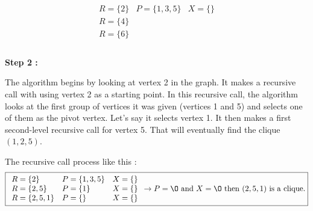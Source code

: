     $$ \boxed{
        \begin{array}{lll}
            R = \{2\} & P = \{1,3,5\} & X =\{\}\\
            R = \{4\} \\
            R = \{6\} \\
        \end{array}
    }$$
    \\
    \hspace*{1cm}  \textbf{Step 2 :}
    \\
    \begin{minipage}{0.4\textwidth}
    \end{minipage}
    \begin{minipage}{0.6\textwidth}
        The algorithm begins by looking at vertex 2 in the graph. It makes a recursive call with using vertex 2 as a starting point. In this recursive call, the algorithm looks at the first group of vertices it was given (vertices 1 and 5) and selects one of them as the pivot vertex. Let's say it selects vertex 1. It then makes a first second-level recursive call for vertex 5. That will eventually find the clique $(1,2,5)$.
    \end{minipage}
    The recursive call process like this  :
    $$ \boxed{
        \begin{array}{lll}
            R = \{2\} & P = \{1,3,5\} & X = \{\} \\
            R = \{2,5\} & P = \{1\} & X = \{\} \\
            R = \{2,5,1\} & P = \{\} & X = \{\} \\
        \end{array} 
        \rightarrow P = \O \text{ and } X = \O \text{ then } (2,5,1) \text{ is a clique.}
    }$$
    \\
    \\
    \begin{minipage}{0.4\textwidth}
    \end{minipage}

